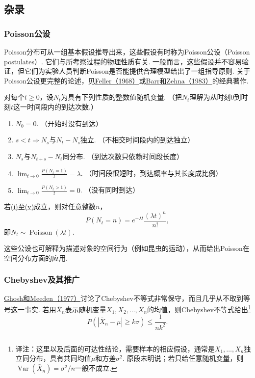 \subsection{杂录}\label{sec:3.8}
\subsubsection{Poisson公设}\label{sec:3.8.1}
Poisson分布可从一组基本假设推导出来，这些假设有时称为Poisson公设（Poisson postulates）. 它们与所考察过程的物理性质有关. 一般而言，这些假设并不容易验证，但它们为实验人员判断Poisson是否能提供合理模型给出了一组指导原则. 关于Poisson公设更完整的论述，见\hyperref[bib:source118]{Feller（1968）}或\hyperref[bib:source12]{Barr和Zehna（1983）}的经典著作.

\begin{theorem}\label{thm:3.8.1}
对每个$t\ge0$，设$N_t$为具有下列性质的整数值随机变量. （把$N_t$理解为从时刻0到时刻$t$这一时间段内的到达次数.）
\begin{enumerate}
\item[(i)]\label{itm:thm:3.8.1:i} $N_0=0$. \hfill（开始时没有到达）
\item[(ii)] $s<t\Rightarrow N_s$与$N_t-N_s$独立. \hfill（不相交时间段内的到达独立）
\item[(iii)] $N_s$与$N_{t+s}-N_t$同分布. \hfill（到达次数只依赖时间段长度）
\item[(iv)] $\displaystyle\lim_{t\to0}\frac{P(N_t=1)}t=\lambda$. \hfill（时间段很短时，到达概率与其长度成比例）
\item[(v)]\label{itm:thm:3.8.1:v} $\displaystyle\lim_{t\to0}\frac{P(N_t>1)}t=0$. \hfill（没有同时到达）
\end{enumerate}
若\hyperref[itm:thm:3.8.1:i]{(i)}至\hyperref[itm:thm:3.8.1:v]{(v)}成立，则对任意整数$n$，
$$P(N_t=n)=e^{-\lambda t}\frac{(\lambda t)^n}{n!},$$
即$N_t\sim\operatorname{Poisson}(\lambda t)$.
\end{theorem}

这些公设也可解释为描述对象的空间行为（例如昆虫的运动），从而给出Poisson在空间分布方面的应用.

\subsubsection{Chebyshev及其推广}\label{sec:3.8.2}
\hyperref[bib:source140]{Ghosh和Meeden（1977）}讨论了Chebyshev不等式非常保守，而且几乎从不取到等号这一事实. 若用$\bar X_n$表示随机变量$X_1,X_2,\ldots,X_n$的均值，则Chebyshev不等式给出\footnote{译注：这里以及后面的可达性结论，需要样本的相应假设，通常是$X_1,\ldots,X_n$独立同分布，具有共同均值$\mu$和方差$\sigma^2$. 原段未明说；若只给任意随机变量，则$\operatorname{Var}(\bar X_n)=\sigma^2/n$一般不成立.}
$$P(|\bar X_n-\mu|\ge k\sigma)\le\frac1{nk^2}.$$

